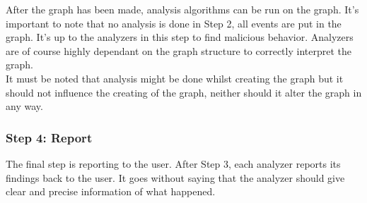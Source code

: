 After the graph has been made, analysis algorithms can be run on the graph. It's important to note that no analysis is done in Step 2, all events are put in the graph. It's up to the analyzers in this step to find malicious behavior. Analyzers are of course highly dependant on the graph structure to correctly interpret the graph.\\

It must be noted that analysis might be done whilst creating the graph but it should not influence the creating of the graph, neither should it alter the graph in any way.

\subsubsection{Step 4: Report}

The final step is reporting to the user. After Step 3, each analyzer reports its findings back to the user. It goes without saying that the analyzer should give clear and precise information of what happened.
